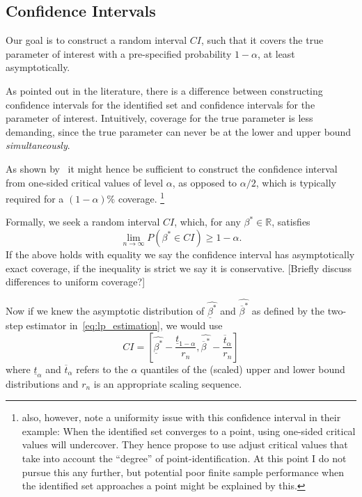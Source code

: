 \documentclass[12pt,a4paper,english]{article} %
\numberwithin{equation}{section}
\theoremstyle{definition}
\theoremstyle{remark}
\theoremstyle{plain}
\begin{document}
\subsection{Confidence Intervals}
Our goal is to construct a random interval $CI$, such that it covers the true parameter of interest with a pre-specified probability $1-\alpha$, at least asymptotically.

As pointed out in the literature, there is a difference between constructing confidence intervals for the identified set and confidence intervals for the parameter of interest.
Intuitively, coverage for the true parameter is less demanding, since the true parameter can never be at the lower and upper bound \textit{simultaneously}.

As shown by~\cite{imbens2004confidence} it might hence be sufficient to construct the confidence interval from one-sided critical values of level $\alpha$, as opposed to $\alpha/2$, which is typically required for a $(1-\alpha)\%$ coverage.
\footnote{\cite{imbens_angrist1994ecma} also, however, note a uniformity issue with this confidence interval in their example: When the identified set converges to a point, using one-sided critical values will undercover.
They hence propose to use adjust critical values that take into account the ``degree'' of point-identification.
At this point I do not pursue this any further, but potential poor finite sample performance when the identified set approaches a point might be explained by this.}

Formally, we seek a random interval $CI$, which, for any $\beta^* \in \mathbb{R}$, satisfies
\begin{equation}
  \lim_{n\to\infty} P(\beta^* \in CI) \geq 1-\alpha.
\end{equation}
If the above holds with equality we say the confidence interval has asymptotically exact coverage, if the inequality is strict we say it is conservative.
[Briefly discuss differences to uniform coverage?]

Now if we knew the asymptotic distribution of $\hat{\underline{\beta}^*}$ and $\hat{\overline{\beta}^*}$ as defined by the two-step estimator in~\ref{eq:lp_estimation}, we would use
\begin{equation*}
  CI = \left[\hat{\underline{\beta}^*} - \frac{\underline{t}_{1-\alpha}}{r_n}, \hat{\overline{\beta}^*} - \frac{\overline{t}_{\alpha}}{r_n}\right]
\end{equation*}
where $\underline{t}_\alpha$ and $\overline{t}_\alpha$ refers to the $\alpha$ quantiles of the (scaled) upper and lower bound distributions and $r_n$ is an appropriate scaling sequence.
\end{document}
